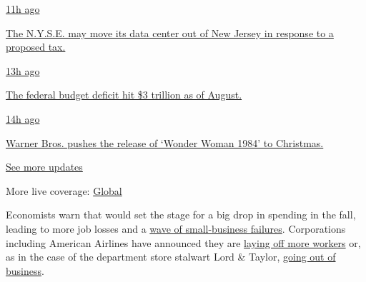 \href{https://www.nytimes3xbfgragh.onion/live/2020/09/11/business/stock-market-today-coronavirus?action=click\&pgtype=Article\&state=default\&region=MAIN_CONTENT_1\&context=storylines_live_updates\#the-nyse-may-move-its-data-center-out-of-new-jersey-in-response-to-a-proposed-tax}{11h
ago}

\href{https://www.nytimes3xbfgragh.onion/live/2020/09/11/business/stock-market-today-coronavirus?action=click\&pgtype=Article\&state=default\&region=MAIN_CONTENT_1\&context=storylines_live_updates\#the-nyse-may-move-its-data-center-out-of-new-jersey-in-response-to-a-proposed-tax}{The
N.Y.S.E. may move its data center out of New Jersey in response to a
proposed tax.}

\href{https://www.nytimes3xbfgragh.onion/live/2020/09/11/business/stock-market-today-coronavirus?action=click\&pgtype=Article\&state=default\&region=MAIN_CONTENT_1\&context=storylines_live_updates\#the-federal-budget-deficit-hit-3-trillion-as-of-august}{13h
ago}

\href{https://www.nytimes3xbfgragh.onion/live/2020/09/11/business/stock-market-today-coronavirus?action=click\&pgtype=Article\&state=default\&region=MAIN_CONTENT_1\&context=storylines_live_updates\#the-federal-budget-deficit-hit-3-trillion-as-of-august}{The
federal budget deficit hit \$3 trillion as of August.}

\href{https://www.nytimes3xbfgragh.onion/live/2020/09/11/business/stock-market-today-coronavirus?action=click\&pgtype=Article\&state=default\&region=MAIN_CONTENT_1\&context=storylines_live_updates\#warner-bros-pushes-the-release-of-wonder-woman-1984-to-christmas}{14h
ago}

\href{https://www.nytimes3xbfgragh.onion/live/2020/09/11/business/stock-market-today-coronavirus?action=click\&pgtype=Article\&state=default\&region=MAIN_CONTENT_1\&context=storylines_live_updates\#warner-bros-pushes-the-release-of-wonder-woman-1984-to-christmas}{Warner
Bros. pushes the release of `Wonder Woman 1984' to Christmas.}

\href{https://www.nytimes3xbfgragh.onion/live/2020/09/11/business/stock-market-today-coronavirus?action=click\&pgtype=Article\&state=default\&region=MAIN_CONTENT_1\&context=storylines_live_updates}{See
more updates}

More live coverage:
\href{https://www.nytimes3xbfgragh.onion/2020/09/11/world/covid-19-coronavirus.html?action=click\&pgtype=Article\&state=default\&region=MAIN_CONTENT_1\&context=storylines_live_updates}{Global}

Economists warn that would set the stage for a big drop in spending in
the fall, leading to more job losses and a
\href{https://www.nytimes3xbfgragh.onion/2020/09/01/business/economy/small-businesses-coronavirus.html}{wave
of small-business failures}. Corporations including American Airlines
have announced they are
\href{https://www.nytimes3xbfgragh.onion/2020/08/25/business/american-airline-furlough-19000.html}{laying
off more workers} or, as in the case of the department store stalwart
Lord \& Taylor,
\href{https://www.nytimes3xbfgragh.onion/aponline/2020/08/28/business/ap-lord-taylor-going-out-of-business.html}{going
out of business}.

